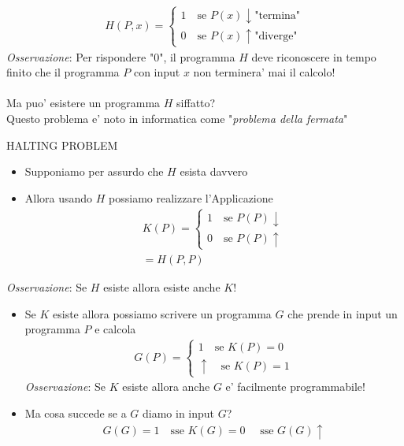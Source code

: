 \documentclass[a4paper,12pt]{article}
\begin{document}
{\begin{align*}
  H(P,x) = \begin{cases}
    1 \quad \text{se } P(x) \downarrow \text{"termina"} \\
    0 \quad \text{se } P(x) \uparrow \text{"diverge"}
  \end{cases}
\end{align*}
\textit{Osservazione}: Per rispondere "$0$", il programma $H$ deve riconoscere in tempo finito che il programma $P$ con input $x$ non terminera' mai il calcolo! \\
\vspace{5px} \\
Ma puo' esistere un programma $H$ siffatto? \\
Questo problema e' noto in informatica come "\textit{problema della fermata}"
\begin{center}
  HALTING PROBLEM
\end{center}
\begin{itemize}
  \item Supponiamo per assurdo che $H$ esista davvero
  \item Allora usando $H$ possiamo realizzare l'Applicazione
  \begin{align*}
    K(P) = \begin{cases}
      1 \quad \text{se } P(P) \downarrow \\
      0 \quad \text{se } P(P) \uparrow
    \end{cases} \\
    = H(P, P)
  \end{align*}
\end{itemize}
\textit{Osservazione}: Se $H$ esiste allora esiste anche $K$! 
\begin{itemize}
  \item Se $K$ esiste allora possiamo scrivere un programma $G$ che prende in input un programma $P$ e calcola
  \begin{align*}
    G(P) = \begin{cases}
      1 \quad \text{se } K(P)=0 \\
      \uparrow \quad \text{se } K(P)=1
    \end{cases}
  \end{align*}
  \textit{Osservazione}: Se $K$ esiste allora anche $G$ e' facilmente programmabile! \\
  \item Ma cosa succede se a $G$ diamo in input $G$?
  \begin{align*}
    G(G)=1 \quad \text{sse } K(G)=0 \quad \text{ sse } G(G)\uparrow \\

\end{align*}
\end{itemize}}
\end{document}
